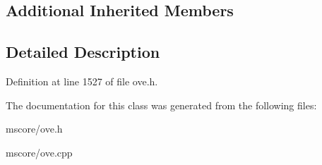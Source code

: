 \subsection*{Additional Inherited Members}


\subsection{Detailed Description}


Definition at line 1527 of file ove.\+h.



The documentation for this class was generated from the following files\+:\begin{DoxyCompactItemize}
\item 
mscore/ove.\+h\item 
mscore/ove.\+cpp\end{DoxyCompactItemize}
